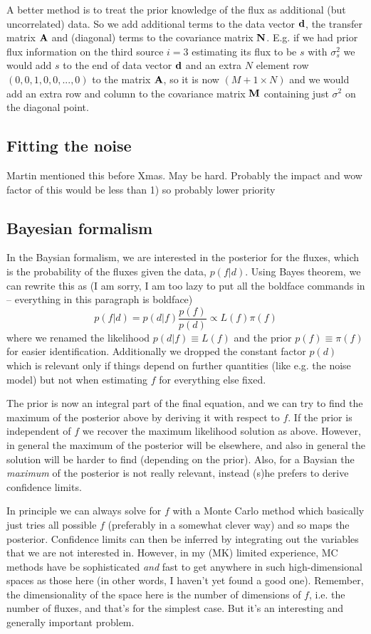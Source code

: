 \documentclass{article}
\begin{document}
A better method is to treat the prior knowledge of the flux as additional (but uncorrelated) data.  So we add additional terms to the data vector ${\bf d}$, the transfer matrix ${\bf A}$ and (diagonal) terms to the covariance matrix ${\bf N}$.  E.g. if we had prior flux information on the third source $i=3$ estimating its flux to be $s$ with $\sigma^2_s$ we would add $s$ to the end of data vector ${\bf d}$ and an extra $N$ element row $(0,0,1,0,0,...,0)$ to the matrix ${\bf A}$, so it is now $(M+1 \times N)$  and we would add an extra row and column to the covariance matrix ${\bf M}$ containing just $\sigma^2$ on the diagonal point.

\subsection{Fitting the noise}
	Martin mentioned this before Xmas.  May be hard.  Probably the impact and wow factor of this would be less than 1) so probably lower priority
	
\subsection{Bayesian formalism}

In the Baysian formalism, we are interested in the posterior for the fluxes, which
is the probability of the fluxes given the data, $p(f|d)$. Using Bayes theorem, we
can rewrite this as (I am sorry, I am too lazy to put all the boldface commands in --
everything in this paragraph is boldface)
\[
p(f|d) = p(d|f) \frac{p(f)}{p(d)} \propto L(f) \pi(f)
\]
where we renamed the likelihood $p(d|f) \equiv L(f)$ and the prior $p(f)\equiv \pi(f)$
for easier identification. Additionally we dropped the constant factor $p(d)$ which is
relevant only if things depend on further quantities (like e.g. the noise model) but not
when estimating $f$ for everything else fixed.

The prior is now an integral part of the final equation, and we can try to find the
maximum of the posterior above by deriving it with respect to $f$. If the prior is
independent of $f$ we recover the maximum likelihood solution as above. However, in
general the maximum of the posterior will be elsewhere, and also in general the
solution will be harder to find (depending on the prior). Also, for a Baysian the
{\em maximum} of the posterior is not really relevant, instead (s)he prefers to
derive confidence limits.

In principle we can always solve for $f$ with a Monte Carlo method which basically
just tries all possible $f$ (preferably in a somewhat clever way) and so maps
the posterior. Confidence limits can then be inferred by integrating out the variables
that we are not interested in. However, in my (MK) limited experience, MC methods
have be sophisticated {\em and} fast to get anywhere in such high-dimensional spaces
as those here (in other words, I haven't yet found a good one). Remember, the dimensionality
of the space here is the number of dimensions of $f$, i.e. the number of fluxes, 
and that's for the simplest case. But it's an interesting and generally important problem.
\end{document}
